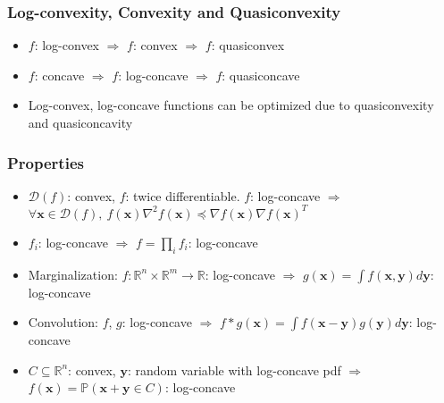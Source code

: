\subsubsection*{Log-convexity, Convexity and Quasiconvexity}
\begin{itemize}
    \item $f$: log-convex $\Rightarrow$ $f$: convex $\Rightarrow$ $f$: quasiconvex
    \item $f$: concave $\Rightarrow$ $f$: log-concave $\Rightarrow$ $f$: quasiconcave
    \item Log-convex, log-concave functions can be optimized due to quasiconvexity and quasiconcavity
\end{itemize}

\subsubsection*{Properties}
\begin{itemize}
    \item $\mathcal{D}(f)$: convex, $f$: twice differentiable. $f$: log-concave $\Rightarrow$
        $\forall \mathbf{x} \in \mathcal{D}(f),~ f(\mathbf{x})\nabla^2f(\mathbf{x}) \preceq \nabla f(\mathbf{x}) \nabla f(\mathbf{x})^T$
    \item $f_i$: log-concave $\Rightarrow$ $f = \prod_{i} f_i$: log-concave
    \item Marginalization: $f:\mathbb{R}^n \times \mathbb{R}^m \rightarrow \mathbb{R}$: log-concave $\Rightarrow$
        $g(\mathbf{x}) = \int f(\mathbf{x}, \mathbf{y}) d\mathbf{y}$: log-concave
    \item Convolution: $f$, $g$: log-concave $\Rightarrow$ $f \ast g (\mathbf{x}) = \int f(\mathbf{x}-\mathbf{y})g(\mathbf{y})d\mathbf{y}$: log-concave
    \item $C \subseteq \mathbb{R}^n$: convex, $\mathbf{y}$: random variable with log-concave pdf
        $\Rightarrow$ $f(\mathbf{x}) = \mathbb{P}(\mathbf{x} + \mathbf{y} \in C)$: log-concave
\end{itemize}
